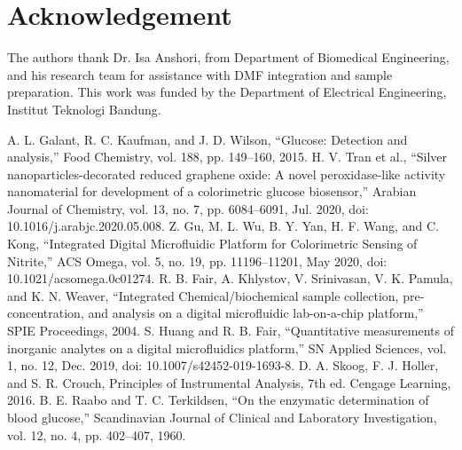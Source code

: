 \documentclass[conference]{IEEEtran}
\begin{document}
\section*{Acknowledgement}
The authors thank Dr. Isa Anshori, from Department of Biomedical Engineering, and his research team for assistance with DMF integration and sample preparation.
This work was funded by the Department of Electrical Engineering, Institut Teknologi Bandung.

\begin{thebibliography}{00}
 A. L. Galant, R. C. Kaufman, and J. D. Wilson, “Glucose: Detection and analysis,” Food Chemistry, vol. 188, pp. 149–160, 2015. 
 H. V. Tran et al., “Silver nanoparticles-decorated reduced graphene oxide: A novel peroxidase-like activity nanomaterial for development of a colorimetric glucose biosensor,” Arabian Journal of Chemistry, vol. 13, no. 7, pp. 6084–6091, Jul. 2020, doi: 10.1016/j.arabjc.2020.05.008.
 Z. Gu, M. L. Wu, B. Y. Yan, H. F. Wang, and C. Kong, “Integrated Digital Microfluidic Platform for Colorimetric Sensing of Nitrite,” ACS Omega, vol. 5, no. 19, pp. 11196–11201, May 2020, doi: 10.1021/acsomega.0c01274.
 R. B. Fair, A. Khlystov, V. Srinivasan, V. K. Pamula, and K. N. Weaver, “Integrated Chemical/biochemical sample collection, pre-concentration, and analysis on a digital microfluidic lab-on-a-chip platform,” SPIE Proceedings, 2004. 
 S. Huang and R. B. Fair, “Quantitative measurements of inorganic analytes on a digital microfluidics platform,” SN Applied Sciences, vol. 1, no. 12, Dec. 2019, doi: 10.1007/s42452-019-1693-8.
 D. A. Skoog, F. J. Holler, and S. R. Crouch, Principles of Instrumental Analysis, 7th ed. Cengage Learning, 2016.
 B. E. Raabo and T. C. Terkildsen, “On the enzymatic determination of blood glucose,” Scandinavian Journal of Clinical and Laboratory Investigation, vol. 12, no. 4, pp. 402–407, 1960. 
\end{thebibliography}
\end{document}
